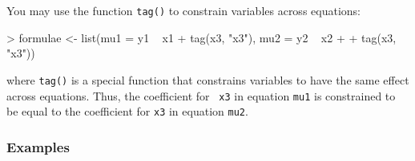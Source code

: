 \documentclass{article}
\begin{document}
You may use the function {\tt tag()} to constrain variables across
equations:
\begin{Schunk}
\begin{Sinput}
> formulae <- list(mu1 = y1 ~ x1 + tag(x3, "x3"), mu2 = y2 ~ x2 + 
+     tag(x3, "x3"))
\end{Sinput}
\end{Schunk}
where {\tt tag()} is a special function that constrains variables to
have the same effect across equations.  Thus, the coefficient for {\tt
x3} in equation {\tt mu1} is constrained to be equal to the
coefficient for {\tt x3} in equation {\tt mu2}.  

\subsubsection{Examples}
\end{document}

